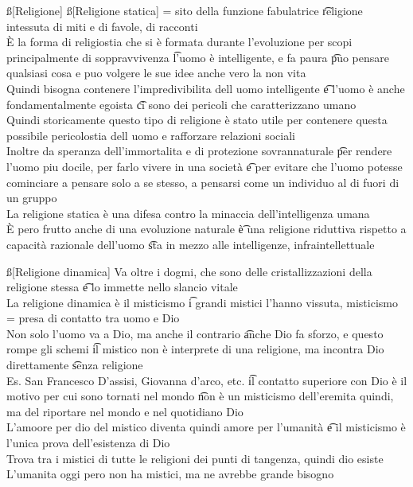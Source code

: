 \documentclass[12pt]{article}
\begin{document}
\ss[Religione]
\ss[Religione statica]
= sito della funzione fabulatrice \t religione intessuta di miti e di favole, di racconti \\
È la forma di religiostia che si è formata durante l'evoluzione per scopi principalmente di soppravvivenza \t l'uomo è intelligente, e fa paura \t puo pensare qualsiasi cosa e puo volgere le sue idee anche vero la non vita \\
Quindi bisogna contenere l'impredivibilita dell uomo intelligente \t e l'uomo è anche fondamentalmente egoista \t ci sono dei pericoli che caratterizzano umano \\
Quindi storicamente questo tipo di religione è stato utile per contenere questa possibile pericolostia dell uomo e rafforzare relazioni sociali \\
Inoltre da speranza dell'immortalita e di protezione sovrannaturale \t per rendere l'uomo piu docile, per farlo vivere in una società \t e per evitare che l'uomo potesse cominciare a pensare solo a se stesso, a pensarsi come un individuo al di fuori di un gruppo \\
La religione statica è una difesa contro la minaccia dell'intelligenza umana \\
È pero frutto anche di una evoluzione naturale \t è una religione riduttiva rispetto a capacità razionale dell'uomo \t sta in mezzo alle intelligenze, infraintellettuale

\ss[Religione dinamica]
Va oltre i dogmi, che sono delle cristallizzazioni della religione stessa \t e lo immette nello slancio vitale \\
La religione dinamica è il misticismo \t i grandi mistici l'hanno vissuta, misticismo = presa di contatto tra uomo e Dio \\
Non solo l'uomo va a Dio, ma anche il contrario \t anche Dio fa sforzo, e questo rompe gli schemi \t il mistico non è interprete di una religione, ma incontra Dio direttamente \t senza religione \\
Es. San Francesco D'assisi, Giovanna d'arco, etc. \t il contatto superiore con Dio è il motivo per cui sono tornati nel mondo \t non è un misticismo dell'eremita quindi, ma del riportare nel mondo e nel quotidiano Dio \\
L'amoore per dio del mistico diventa quindi amore per l'umanità \t e il misticismo è l'unica prova dell'esistenza di Dio \\
Trova tra i mistici di tutte le religioni dei punti di tangenza, quindi dio esiste \\
L'umanita oggi pero non ha mistici, ma ne avrebbe grande bisogno
\end{document}

